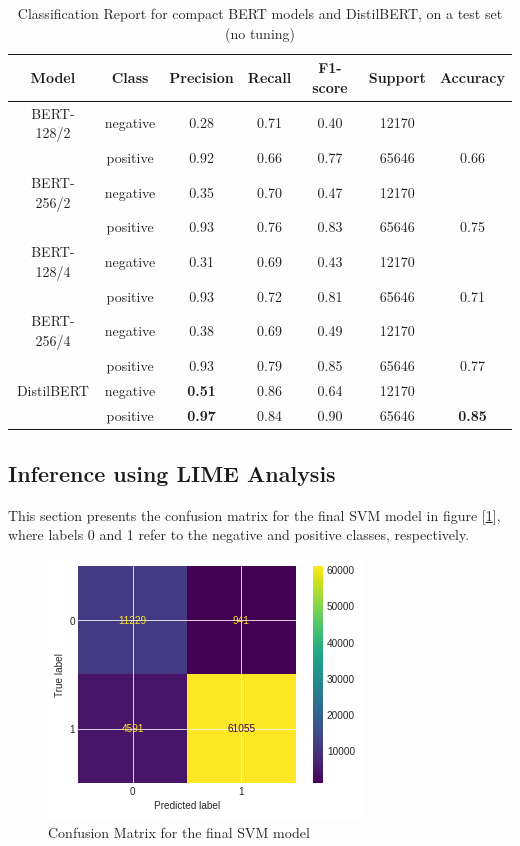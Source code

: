\documentclass[11pt]{article}
\begin{document}
\begin{table}
    \centering
    \begin{tabular}{c c c c c c c}
    \hline
  \textbf{Model}& \textbf{Class} & \textbf{Precision} &  \textbf{Recall} & \textbf{F1-score} & \textbf{Support} & \textbf{Accuracy}  \\ 
 \hline 
         {\small BERT-128/2} & negative & 0.28 &0.71& 0.40     &12170&\\ 
         & positive &0.92&0.66&0.77 &65646 & 0.66\\  
     {\small BERT-256/2} & negative& 0.35 &0.70& 0.47&12170  \\  
          & positive&0.93 &0.76 & 0.83 & 65646& 0.75\\  
          {\small BERT-128/4} &negative&0.31 &0.69& 0.43 &12170\\  
          & positive &0.93 &0.72& 0.81 &65646 &0.71 \\  
         {\small BERT-256/4} & negative&0.38& 0.69&0.49 &12170\\ 
         &positive & 0.93 &0.79 &0.85 &65646 &0.77 \\  
         {\small DistilBERT} & negative &\textbf{0.51} &0.86 &0.64 &12170 \\
         & positive& \textbf{0.97}&0.84 &0.90&65646 &\textbf{0.85}\\  
         \hline 
        \end{tabular}
    \caption{Classification Report for compact BERT models and DistilBERT, on a test set (no tuning)}
    \label{tab:bert_distil_class_report}
\end{table}

\subsection{Inference using LIME Analysis}
This section presents the confusion matrix for the final SVM model in figure [\ref{fig:confusion_mat}], where labels 0 and 1 refer to the negative and positive classes, respectively.
\begin{figure}[h!]
    \centering
    \includegraphics[scale=0.55]{figures/LinearSVC_confusion_matrix.png}
    \caption{Confusion Matrix for the final SVM model}
    \label{fig:confusion_mat}
\end{figure}
\end{document}
